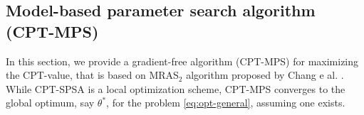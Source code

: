 % 
% 
% 


\subsection{Model-based parameter search algorithm (CPT-MPS)}
\label{sec:mras}
In this section, we provide a gradient-free algorithm (CPT-MPS) for maximizing the CPT-value, that is based on MRAS$_2$ algorithm proposed by Chang e al. \cite{chang2013simulation}.
While CPT-SPSA is a local optimization scheme, CPT-MPS converges to the global optimum, say $\theta^*$, for the problem \eqref{eq:opt-general}, assuming one exists.



